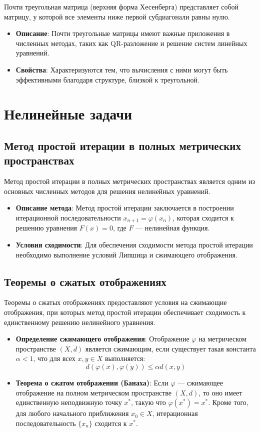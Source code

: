 \documentclass{article}
\begin{document}
Почти треугольная матрица (верхняя форма Хесенберга) представляет собой матрицу, у которой все элементы ниже первой субдиагонали равны нулю.

\begin{itemize}
  \item \textbf{Описание}: Почти треугольные матрицы имеют важные приложения в численных методах, таких как QR-разложение и решение систем линейных уравнений.
  \item \textbf{Свойства}: Характеризуются тем, что вычисления с ними могут быть эффективными благодаря структуре, близкой к треугольной.
\end{itemize}

\section{Нелинейные задачи}

\subsection{Метод простой итерации в полных метрических пространствах}

Метод простой итерации в полных метрических пространствах является одним из основных численных методов для решения нелинейных уравнений.

\begin{itemize}
  \item \textbf{Описание метода}: Метод простой итерации заключается в построении итерационной последовательности \( x_{n+1} = \varphi(x_n) \), которая сходится к решению уравнения \( F(x) = 0 \), где \( F \) — нелинейная функция.
  \item \textbf{Условия сходимости}: Для обеспечения сходимости метода простой итерации необходимо выполнение условий Липшица и сжимающего отображения.
\end{itemize}

\subsection{Теоремы о сжатых отображениях}

Теоремы о сжатых отображениях предоставляют условия на сжимающие отображения, при которых метод простой итерации обеспечивает сходимость к единственному решению нелинейного уравнения.

\begin{itemize}
  \item \textbf{Определение сжимающего отображения}: Отображение \( \varphi \) на метрическом пространстве \( (X, d) \) является сжимающим, если существует такая константа \( \alpha < 1 \), что для всех \( x, y \in X \) выполняется:
  \[
  d(\varphi(x), \varphi(y)) \leq \alpha d(x, y)
  \]
  \item \textbf{Теорема о сжатом отображении (Банаха)}: Если \( \varphi \) — сжимающее отображение на полном метрическом пространстве \( (X, d) \), то оно имеет единственную неподвижную точку \( x^* \), такую что \( \varphi(x^*) = x^* \). Кроме того, для любого начального приближения \( x_0 \in X \), итерационная последовательность \( \{x_n\} \) сходится к \( x^* \).
\end{itemize}
\end{document}
